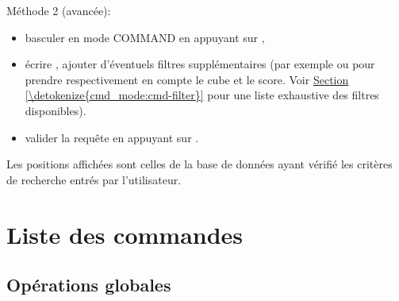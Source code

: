 \documentclass[letterpaper,10pt,french]{sphinxmanual}
\begin{document}
\sphinxAtStartPar
Méthode 2 (avancée):
\begin{itemize}
\item {} 
\sphinxAtStartPar
basculer en mode COMMAND en appuyant sur ,

\item {} 
\sphinxAtStartPar
écrire , ajouter d’éventuels filtres supplémentaires (par exemple
 ou  pour prendre respectivement en compte le cube et le
score. Voir \hyperref[\detokenize{cmd_mode:cmd-filter}]{Section \ref{\detokenize{cmd_mode:cmd-filter}}} pour une liste exhaustive des
filtres disponibles).

\item {} 
\sphinxAtStartPar
valider la requête en appuyant sur .

\end{itemize}

\sphinxAtStartPar
Les positions affichées sont celles de la base de données ayant vérifié
les critères de recherche entrés par l’utilisateur.

\sphinxstepscope


\section{Liste des commandes}
\label{\detokenize{cmd_mode:liste-des-commandes}}\label{\detokenize{cmd_mode:cmd-mode}}\label{\detokenize{cmd_mode::doc}}

\subsection{Opérations globales}
\label{\detokenize{cmd_mode:operations-globales}}\label{\detokenize{cmd_mode:cmd-global}}
\end{document}
